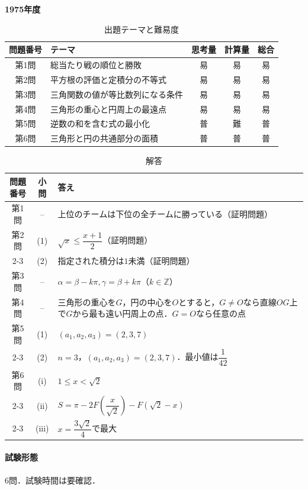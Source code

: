 \documentclass[../../main.tex]{subfiles}
\begin{document}
\begin{center}
  {\fontsize{48pt}{58pt}\selectfont \textbf{1975}\normalsize\textbf{年度}}
\end{center}

\begin{table}[htb]
  \centering
  \caption{出題テーマと難易度}
  \begin{tabular}{|c|p{6.2cm}|c|c|c|}
    \hline
    \textbf{問題番号} & \textbf{テーマ} & \textbf{思考量} & \textbf{計算量} & \textbf{総合} \\
    \hline
    第1問 & 総当たり戦の順位と勝敗 & 易 & 易 & 易 \\
    \hline
    第2問 & 平方根の評価と定積分の不等式 & 易 & 易 & 易 \\
    \hline
    第3問 & 三角関数の値が等比数列になる条件 & 易 & 易 & 易 \\
    \hline
    第4問 & 三角形の重心と円周上の最遠点 & 易 & 易 & 易 \\
    \hline
    第5問 & 逆数の和を含む式の最小化 & 普 & 難 & 普 \\
    \hline
    第6問 & 三角形と円の共通部分の面積 & 普 & 普 & 普 \\
    \hline
  \end{tabular}
\end{table}

\begin{table}[htb]
  \centering
  \caption{解答}
  \renewcommand{\arraystretch}{1.4}
  \begin{tabular}{|c|c|p{9cm}|}
    \hline
    \textbf{問題番号} & \textbf{小問} & \textbf{答え} \\
    \hline
    第1問 & -- & 上位のチームは下位の全チームに勝っている（証明問題） \\
    \hline
    第2問 & (1) & $\sqrt{x}\le\dfrac{x+1}{2}$（証明問題） \\
    \cline{2-3}
    & (2) & 指定された積分は$1$未満（証明問題） \\
    \hline
    第3問 & -- & $\alpha=\beta-k\pi,\gamma=\beta+k\pi$（$k\in\mathbb{Z}$） \\
    \hline
    第4問 & -- & 三角形の重心を$G$，円の中心を$O$とすると，$G\ne O$なら直線$OG$上で$G$から最も遠い円周上の点．$G=O$なら任意の点 \\
    \hline
    第5問 & (1) & $(a_1,a_2,a_3)=(2,3,7)$ \\
    \cline{2-3}
    & (2) & $n=3$，$(a_1,a_2,a_3)=(2,3,7)$．最小値は$\dfrac{1}{42}$ \\
    \hline
    第6問 & (i) & $1\le x<\sqrt{2}$ \\
    \cline{2-3}
    & (ii) & $S=\pi-2F(\dfrac{x}{\sqrt{2}})-F(\sqrt{2}-x)$ \\
    \cline{2-3}
    & (iii) & $x=\dfrac{3\sqrt{2}}{4}$で最大 \\
    \hline
  \end{tabular}
\end{table}

\paragraph{試験形態}
6問．試験時間は要確認．
\end{document}
